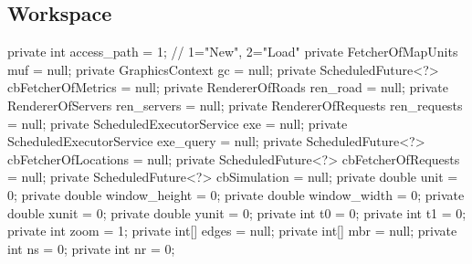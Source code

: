 \subsection{Workspace}
\nwenddocs{}\plusendmoddef
private int access_path = 1;  // 1="New", 2="Load"
private FetcherOfMapUnits muf = null;
private GraphicsContext gc = null;
private ScheduledFuture<?> cbFetcherOfMetrics = null;
private RendererOfRoads ren_road = null;
private RendererOfServers ren_servers = null;
private RendererOfRequests ren_requests = null;
private ScheduledExecutorService exe = null;
private ScheduledExecutorService exe_query = null;
private ScheduledFuture<?> cbFetcherOfLocations = null;
private ScheduledFuture<?> cbFetcherOfRequests = null;
private ScheduledFuture<?> cbSimulation = null;
private double unit = 0;
private double window_height = 0;
private double window_width = 0;
private double xunit = 0;
private double yunit = 0;
private int t0 = 0;
private int t1 = 0;
private int zoom = 1;
private int[] edges = null;
private int[] mbr = null;
private int ns = 0;
private int nr = 0;
\nwendcode{}\nwdocspar

